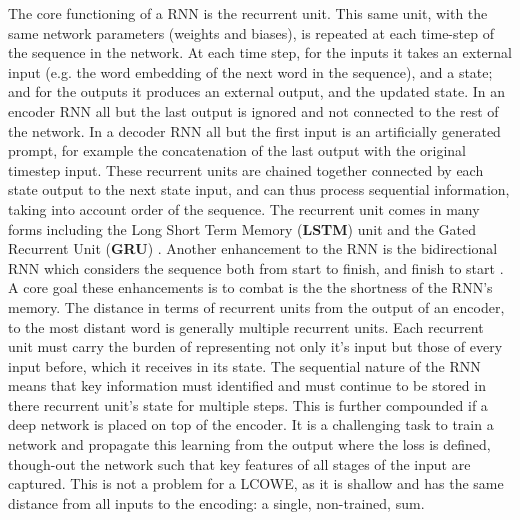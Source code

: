 \documentclass{book}
\begin{document}
The core functioning of a RNN is the recurrent unit.
This  same unit, with the same network parameters (weights and biases),
is repeated at each time-step of the sequence in the network.
At each time step, for the inputs it takes an external input (e.g. the word embedding of the next word in the sequence), and a state;
and for the outputs it produces an external output, and the updated state.
In an encoder RNN all but the last output is ignored and not connected to the rest of the network.
In a decoder RNN all but the first input is an artificially generated prompt, for example the concatenation of the last output with the original timestep input.
These recurrent units are chained together connected by each state output to the next state input,
and can thus process sequential information, taking into account order of the sequence.
The recurrent unit comes in many forms including the 
Long Short Term Memory (\textbf{LSTM}) unit \citep{hochreiter1997long,gers1999learning}
and the Gated Recurrent Unit (\textbf{GRU})  \citep{chung2014empirical,cho2014properties}.
Another enhancement to the RNN is the bidirectional RNN
which considers the sequence both from start to finish, and finish to start \citep{schuster1997bidirectional}.
A core goal these enhancements is to combat is the the shortness of the RNN's memory.
The distance in terms of recurrent units from the output of an encoder, to the most distant word is generally multiple recurrent units.
Each recurrent unit must carry the burden of representing not only it's input but those of every input before, which it receives in its state.
The sequential nature of the RNN means that key information must identified and must continue to be stored in there recurrent unit's state for multiple steps.
This is further compounded if a deep network is placed on top of the encoder.
It is a challenging task to train a network and propagate this learning from the output where the loss is defined, though-out the network such that key features of all stages of the input are captured.
This is not a problem for a LCOWE, as it is shallow and has the same distance from all inputs to the encoding: a single, non-trained, sum.
\end{document}
